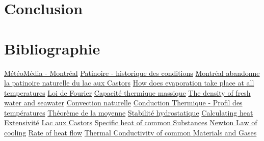 \documentclass[12pt]{article}
\numberwithin{figure}{section}
\begin{document}
\section{Conclusion}

\clearpage
\section{Bibliographie}
\begin{thebibliography}{Xyz}
     \href{https://www.meteomedia.com/ca/api/sitewrapper/index?b=%2Fstatistics%2F&p=%2Fprevisions%2Fstatistiques%2Findex&url=%2Fstatistics%2Fcaqc0363%2Fmontreal%2F%2F%2F%3F}
        {M\'et\'eoM\'edia - Montr\'eal}
     \href{http://donnees.ville.montreal.qc.ca/dataset/patinoires-historique}
        {Patinoire - historique des conditions}
     \href{https://www.ledevoir.com/politique/montreal/517828/patinoire-du-lac-aux-castors}
        {Montr\'eal abandonne la patinoire naturelle du lac aux Castors}
     \href{https://www.quora.com/How-does-evaporation-take-place-at-all-temperatures-whereas-boiling-takes-place-at-a-fixed-temperature-under-a-given-pressure}
        {How does evaporation take place at all temperatures}
     \href{https://fr.wikipedia.org/wiki/Conduction_thermique#Loi_de_Fourier}
        {Loi de Fourier}
     \href{https://fr.wikipedia.org/wiki/Capacit%C3%A9_thermique_massique}
        {Capacit\'e thermique massique}
     \href{http://www.open.edu/openlearn/science-maths-technology/the-oceans/content-section-3.2}
        {The density of fresh water and seawater}
     \href{https://fr.wikipedia.org/wiki/Convection_thermique#Convection_naturelle}
        {Convection naturelle}
     \href{https://fr.wikipedia.org/wiki/Conduction_thermique#Surfaces_planes_en_série}
        {Conduction Thermique - Profil des temp\'eratures}
     \href{https://fr.wikipedia.org/wiki/Th%C3%A9or%C3%A8me_de_la_moyenne}
        {Th\'eor\`eme de la moyenne}
     \href{https://fr.wikipedia.org/wiki/Gradient_thermique_adiabatique#Atmosph.C3.A8re_stable}
        {Stabilit\'e hydrostatique}
     \href{https://simple.wikipedia.org/wiki/Specific_heat#Usage}
        {Calculating heat}
     \href{https://fr.wikipedia.org/wiki/Extensivit%C3%A9_et_intensivit%C3%A9_(physique)}
        {Extensivit\'e}
     \href{https://fr.wikipedia.org/wiki/Lac_aux_Castors_(Montr%C3%A9al)}
        {Lac aux Castors}
     \href{https://www.engineeringtoolbox.com/specific-heat-capacity-d_391.html}
        {Specific heat of common Substances}
     \href{https://en.wikipedia.org/wiki/Newton%27s_law_of_cooling}
        {Newton Law of cooling}
     \href{https://en.wikipedia.org/wiki/Rate_of_heat_flow}
        {Rate of heat flow}
     \href{https://www.engineeringtoolbox.com/thermal-conductivity-d_429.html}
        {Thermal Conductivity of common Materials and Gases}
\end{thebibliography}
\end{document}
